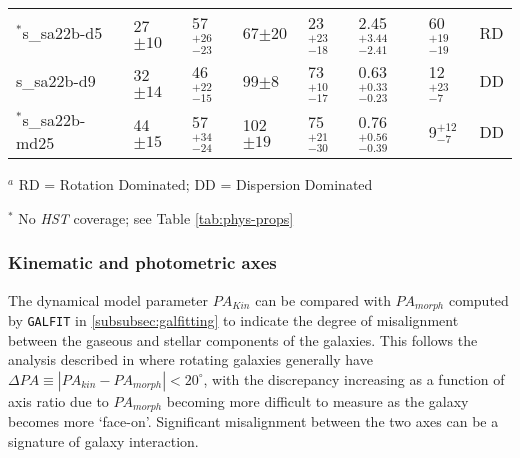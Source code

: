 \documentclass[fleqn,usenatbib]{mn2e}
\begin{document}
\begin{table*}
\begin{threeparttable}
\begin{tabular}{llllllll}
$^{*}$s\_sa22b-d5     & 27$\pm10$                    & 57$^{+26}_{-23}$                     & 67$\pm20$                  & 23$^{+23}_{-18}$          & 2.45$^{+3.44}_{-2.41}$               & 60$^{+19}_{-19}$ & RD   \\[1ex]
s\_sa22b-d9     & 32$\pm14$                    & 46$^{+22}_{-15}$                     & 99$\pm8$                  & 73$^{+10}_{-17}$             & 0.63$^{+0.33}_{-0.23}$                 & 12$^{+23}_{-7}$ & DD   \\[1ex]
$^{*}$s\_sa22b-md25   & 44$\pm15$           & 57$^{+34}_{-24}$                     & 102$\pm19$   & 75$^{+21}_{-30}$                   & 0.76$^{+0.56}_{-0.39}$                & 9$^{+12}_{-7}$ & DD

\end{tabular}
\begin{tablenotes}
      \small
      \item $^{a}$ RD = Rotation Dominated; DD = Dispersion Dominated
      \item $^{*}$ No {\em HST} coverage; see Table \ref{tab:phys-props}
    \end{tablenotes}
  \end{threeparttable}
  \end{table*}

\subsubsection{Kinematic and photometric axes}\label{subsubsection:kin_and_phot}

The dynamical model parameter $PA_{Kin}$ can be compared with $PA_{morph}$ computed by {\tt GALFIT} in \cref{subsubsec:galfitting} to indicate the degree of misalignment between the gaseous and stellar components of the galaxies.
This follows the analysis described in \citep[e.g.][]{Epinat2008,Epinat2012,Barrera-Ballesteros2014,Barrera-Ballesteros2015,Wisnioski2015,Harrison2017,Swinbank2017} where rotating galaxies generally have $\Delta PA \equiv |PA_{kin}-PA_{morph}| < 20^{\circ}$, with the discrepancy increasing as a function of axis ratio due to $PA_{morph}$ becoming more difficult to measure as the galaxy becomes more `face-on'.
Significant misalignment between the two axes can be a signature of galaxy interaction.
\end{document}

